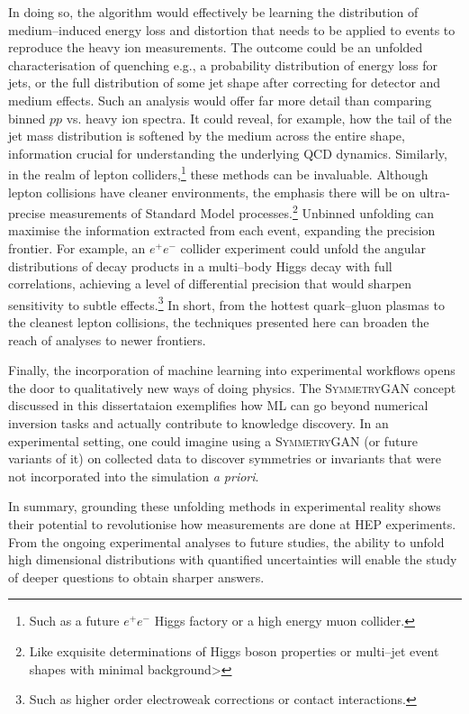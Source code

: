         In doing so, the algorithm would effectively be learning the distribution of medium--induced energy loss and distortion that needs to be applied to events to reproduce the heavy ion measurements.
        The outcome could be an unfolded characterisation of quenching e.g., a probability distribution of energy loss for jets, or the full distribution of some jet shape after correcting for detector and medium effects.
        Such an analysis would offer far more detail than comparing binned $pp$ vs. heavy ion spectra.
        It could reveal, for example, how the tail of the jet mass distribution is softened by the medium across the entire shape, information crucial for understanding the underlying QCD dynamics.
        Similarly, in the realm of lepton colliders,\footnote{Such as a future $e^+e^-$ Higgs factory or a high energy muon collider.} these methods can be invaluable.
        Although lepton collisions have cleaner environments, the emphasis there will be on ultra-precise measurements of Standard Model processes.\footnote{Like exquisite determinations of Higgs boson properties or multi--jet event shapes with minimal background>}
        Unbinned unfolding can maximise the information extracted from each event, expanding the precision frontier.
        For example, an $e^+e^-$ collider experiment could unfold the angular distributions of decay products in a multi--body Higgs decay with full correlations, achieving a level of differential precision that would sharpen sensitivity to subtle effects.\footnote{Such as higher order electroweak corrections or contact interactions.}
        In short, from the hottest quark--gluon plasmas to the cleanest lepton collisions, the techniques presented here can broaden the reach of analyses to newer frontiers.

        Finally, the incorporation of machine learning into experimental workflows opens the door to qualitatively new ways of doing physics.
        The \textsc{SymmetryGAN} concept discussed in this dissertataion exemplifies how ML can go beyond numerical inversion tasks and actually contribute to knowledge discovery.
        In an experimental setting, one could imagine using a \textsc{SymmetryGAN} (or future variants of it) on collected data to discover symmetries or invariants that were not incorporated into the simulation \textit{a priori}.
    
        In summary, grounding these unfolding methods in experimental reality shows their potential to revolutionise how measurements are done at HEP experiments.
        From the ongoing experimental analyses to future studies, the ability to unfold high dimensional distributions with quantified uncertainties will enable the study of deeper questions to obtain sharper answers.
        
